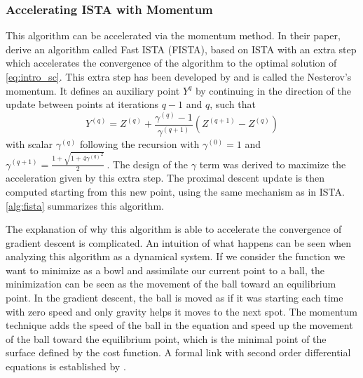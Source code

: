 \documentclass[../thesis.tex]{subfiles}
\begin{document}

\subsubsection{Accelerating ISTA with Momentum}
\label{ssub:cdl_fista}


	This algorithm can be accelerated via the momentum method. In their paper,
	\citet{Beck2009} derive an algorithm called Fast ISTA (FISTA), based on ISTA
	with an extra step which accelerates the convergence of the algorithm to the
	optimal solution of \autoref{eq:intro_sc}. This extra step has been developed
	by \citet{Nesterov1983} and is called the Nesterov's momentum. It defines an
	auxiliary point $Y^{q}$ by continuing in the direction of the update between
	points at iterations $q-1$ and $q$, such that
	\[
	Y^{(q)} = Z^{(q)} + \frac{\gamma^{(q) }- 1}{\gamma^{(q+1)}}
						\left(Z^{(q+1)} - Z^{(q)}\right)
	\]
	with scalar $\gamma^{(q)}$ following the recursion with $\gamma^{(0)} = 1$ and
	$\gamma^{(q+1)} = \frac{1 + \sqrt{1 + 4{\gamma^{(q)}}^2}}{2}~.$ The design of
	the $\gamma$  term was derived to maximize the acceleration given by this extra
	step. The proximal descent update is then computed starting from this new point,
	using the same mechanism as in ISTA. \autoref{alg:fista} summarizes this algorithm.
	
	The explanation of why this algorithm is able to accelerate the convergence of
	gradient descent is complicated. An intuition of what happens can be seen when
	analyzing this algorithm as a dynamical system. If we consider the function we
	want to minimize as a bowl and assimilate our current point to a ball, the
	minimization can be seen as the movement of the ball toward an equilibrium
	point. In the gradient descent, the ball is moved as if it was starting each
	time with zero speed and only gravity helps it moves to the next spot. The
	momentum technique adds the speed of the ball in the equation and speed up the
	movement of the ball toward the equilibrium point, which is the minimal point
	of the surface defined by the cost function. A formal link with second order
	differential equations is established by \citet{Su2016}.
\end{document}
